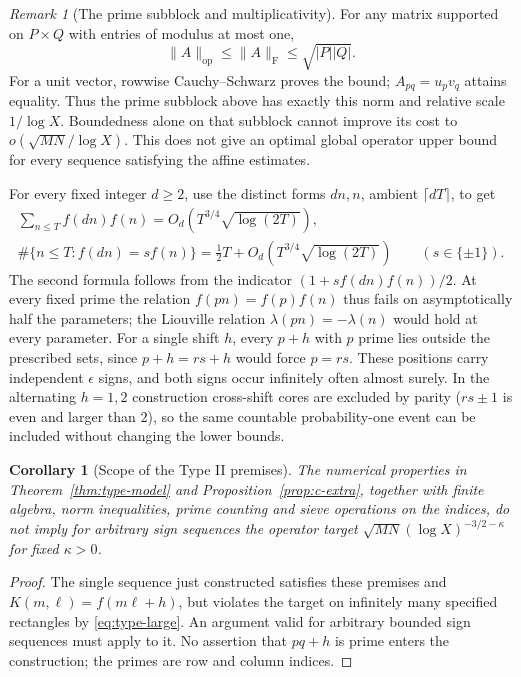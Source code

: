 \documentclass[11pt]{article}
\newtheorem{corollary}[theorem]{Corollary}
\theoremstyle{definition}
\theoremstyle{remark}
\newtheorem{remark}[theorem]{Remark}
\numberwithin{equation}{section}
\newcommand{\op}{\mathrm{op}}
\newcommand{\Frob}{\mathrm{F}}
\begin{document}
\begin{remark}[The prime subblock and multiplicativity]\label{rem:c-sharpness}
For any matrix supported on $P\times Q$ with entries of modulus at most one,
\begin{equation}\label{eq:c-subblock-sharp}
 \|A\|_\op\le\|A\|_{\Frob}\le\sqrt{|P||Q|}.
\end{equation}
For a unit vector, rowwise Cauchy--Schwarz proves the bound; $A_{pq}=u_pv_q$ attains equality.
Thus the prime subblock above has exactly this norm and relative scale $1/\log X$.
Boundedness alone on that subblock cannot improve its cost to $o(\sqrt{MN}/\log X)$.
This does not give an optimal global operator upper bound for every sequence satisfying the affine estimates.

For every fixed integer $d\ge2$, use the distinct forms $dn,n$, ambient $\lceil dT\rceil$, to get
\begin{equation}\label{eq:c-nonmultiplicative}
\begin{gathered}
 \sum_{n\le T}f(dn)f(n)=O_d(T^{3/4}\sqrt{\log(2T)}),\\
 \#\{n\le T:f(dn)=s f(n)\}
 =\tfrac12T+O_d(T^{3/4}\sqrt{\log(2T)})\qquad(s\in\{\pm1\}).
\end{gathered}
\end{equation}
The second formula follows from the indicator $(1+s f(dn)f(n))/2$.
At every fixed prime the relation $f(pn)=f(p)f(n)$ thus fails on asymptotically half the parameters;
the Liouville relation $\lambda(pn)=-\lambda(n)$ would hold at every parameter.
For a single shift $h$, every $p+h$ with $p$ prime lies outside the prescribed sets, since
$p+h=rs+h$ would force $p=rs$. These positions carry independent $\epsilon$ signs, and both signs occur
infinitely often almost surely. In the alternating $h=1,2$ construction cross-shift cores are excluded
by parity ($rs\pm1$ is even and larger than $2$), so the same countable probability-one event can be
included without changing the lower bounds.
\end{remark}
\begin{corollary}[Scope of the Type II premises]\label{cor:c-scope}
The numerical properties in Theorem~\ref{thm:type-model} and Proposition~\ref{prop:c-extra}, together
with finite algebra, norm inequalities, prime counting and sieve operations on the indices, do not imply
for arbitrary sign sequences the operator target $\sqrt{MN}(\log X)^{-3/2-\kappa}$ for fixed
$\kappa>0$.
\end{corollary}
\begin{proof}
The single sequence just constructed satisfies these premises and $K(m,\ell)=f(m\ell+h)$,
but violates the target on infinitely many specified rectangles by \eqref{eq:type-large}.
An argument valid for arbitrary bounded sign sequences must apply to it. No assertion that
$pq+h$ is prime enters the construction; the primes are row and column indices.
\end{proof}
\end{document}
